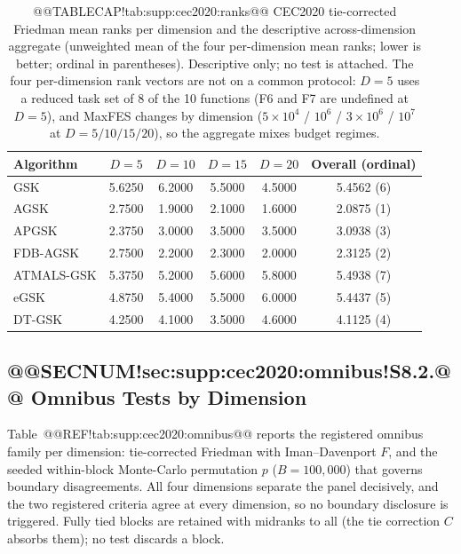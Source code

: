 \documentclass[10pt,a4paper]{article}
\begin{document}
\begin{table}[H]
\caption{@@TABLECAP!tab:supp:cec2020:ranks@@ CEC2020 tie-corrected Friedman mean ranks per dimension and the
descriptive across-dimension aggregate (unweighted mean of the four
per-dimension mean ranks; lower is better; ordinal in parentheses).
Descriptive only; no test is attached.  The four per-dimension rank
vectors are not on a common protocol: $D = 5$ uses a reduced task set of
8 of the 10 functions (F6 and F7 are undefined at $D = 5$), and MaxFES
changes by dimension ($5 \times 10^{4}$ / $10^{6}$ / $3 \times 10^{6}$
/ $10^{7}$ at $D = 5/10/15/20$), so the aggregate mixes budget regimes.
}\label{tab:supp:cec2020:ranks}



\zebra
\begin{tabular}{lccccc}
\toprule
\textbf{Algorithm} & \textbf{$D=5$} & \textbf{$D=10$} &
\textbf{$D=15$} & \textbf{$D=20$} & \textbf{Overall (ordinal)} \\
\midrule
GSK & 5.6250 & 6.2000 & 5.5000 & 4.5000 & 5.4562 (6) \\
AGSK & 2.7500 & 1.9000 & 2.1000 & 1.6000 & 2.0875 (1) \\
APGSK & 2.3750 & 3.0000 & 3.5000 & 3.5000 & 3.0938 (3) \\
FDB-AGSK & 2.7500 & 2.2000 & 2.3000 & 2.0000 & 2.3125 (2) \\
ATMALS-GSK & 5.3750 & 5.2000 & 5.6000 & 5.8000 & 5.4938 (7) \\
eGSK & 4.8750 & 5.4000 & 5.5000 & 6.0000 & 5.4437 (5) \\
DT-GSK & 4.2500 & 4.1000 & 3.5000 & 4.6000 & 4.1125 (4) \\
\bottomrule
\end{tabular}
\end{table}

\subsection{@@SECNUM!sec:supp:cec2020:omnibus!S8.2.@@ Omnibus Tests by Dimension}\label{sec:supp:cec2020:omnibus}

Table~@@REF!tab:supp:cec2020:omnibus@@ reports the registered omnibus
family per dimension: tie-corrected Friedman with Iman--Davenport $F$, and
the seeded within-block Monte-Carlo permutation $p$ ($B = 100{,}000$)
that governs boundary disagreements.  All four dimensions separate the
panel decisively, and the two registered criteria agree at every
dimension, so no boundary disclosure is triggered.  Fully tied blocks are
retained with midranks to all (the tie correction $C$ absorbs them);
no test discards a block.
\end{document}
